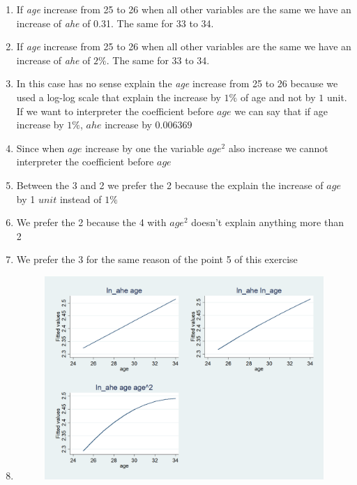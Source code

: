 \documentclass[10pt,a4paper]{article}
\author{Michele De Vita}
\begin{document}
	\begin{enumerate}
		\item If \textit{age} increase from 25 to 26 when all other variables are the same we have an increase of \textit{ahe} of 0.31. The same for 33 to 34.
		\item  If \textit{age} increase from 25 to 26 when all other variables are the same we have an increase of \textit{ahe} of $ 2\% $. The same for 33 to 34.
		\item In this case has no sense explain the \textit{age} increase from 25 to 26 because we used a log-log scale that explain the increase by $ 1\% $ of age and not by $ 1 $ unit. If we want to interpreter the coefficient before $ age $ we can say that if age increase by $ 1\% $,  $ ahe $  increase by $ 0.006369 $
		\item Since when $ age  $ increase by one the variable $ age^2 $ also increase we cannot interpreter the coefficient before $ age $
		\item Between the 3 and 2 we prefer the 2 because the explain the increase of $ age $ by 1 $ unit $ instead of $ 1\% $ 
		\item We prefer the 2 because the 4 with $ age^2 $ doesn't explain anything more than 2
		\item We prefer the 3 for the same reason of the point 5 of this exercise
		\item 
		\begin{figure}[H]
			\centering
			\includegraphics[width=0.7\linewidth]{plot_3_regressions}

		\end{figure}
		
	\end{enumerate}
\end{document}
